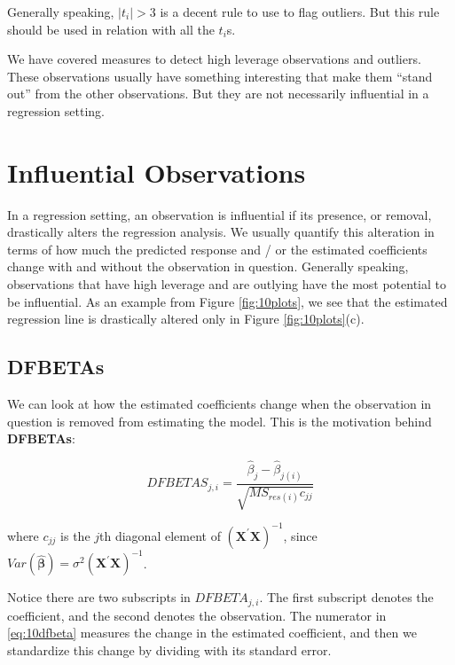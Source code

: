 \documentclass[
]{book}
\begin{document}
Generally speaking, \(|t_i| > 3\) is a decent rule to use to flag outliers. But this rule should be used in relation with all the \(t_i\)s.

We have covered measures to detect high leverage observations and outliers. These observations usually have something interesting that make them ``stand out'' from the other observations. But they are not necessarily influential in a regression setting.

\hypertarget{influential-observations}{%
\section{Influential Observations}\label{influential-observations}}

In a regression setting, an observation is influential if its presence, or removal, drastically alters the regression analysis. We usually quantify this alteration in terms of how much the predicted response and / or the estimated coefficients change with and without the observation in question. Generally speaking, observations that have high leverage and are outlying have the most potential to be influential. As an example from Figure \ref{fig:10plots}, we see that the estimated regression line is drastically altered only in Figure \ref{fig:10plots}(c).

\hypertarget{dfbetas}{%
\subsection{DFBETAs}\label{dfbetas}}

We can look at how the estimated coefficients change when the observation in question is removed from estimating the model. This is the motivation behind \textbf{DFBETAs}:

\begin{equation}
DFBETAS_{j,i} = \frac{\hat{\beta}_j-\hat{\beta}_{j(i)}}
{\sqrt{MS_{res(i)}c_{jj}}}
\label{eq:10dfbeta}
\end{equation}

where \(c_{jj}\) is the \(j\)th diagonal element of
\(\left(\boldsymbol{X^{\prime}X}\right)^{-1}\), since \(Var(\boldsymbol{\hat{\beta}}) = \sigma^2 \left(\boldsymbol{X^{\prime}X}\right)^{-1}\).

Notice there are two subscripts in \(DFBETA_{j,i}\). The first subscript denotes the coefficient, and the second denotes the observation. The numerator in \eqref{eq:10dfbeta} measures the change in the estimated coefficient, and then we standardize this change by dividing with its standard error.
\end{document}
